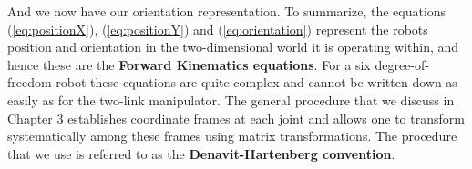 	And we now have our orientation representation. To summarize, the equations (\ref{eq:positionX}), (\ref{eq:positionY}) and (\ref{eq:orientation}) represent the robots position and orientation in the two-dimensional world it is operating within, and hence these are the \textbf{Forward Kinematics equations}.
	For a six degree-of-freedom robot these equations are quite complex and cannot be written down as easily as for the two-link manipulator. The general procedure that we discuss in Chapter 3 establishes coordinate frames at each joint and allows one to transform systematically among these frames using matrix transformations. The procedure that we use is referred to as the \textbf{Denavit-Hartenberg convention}.
